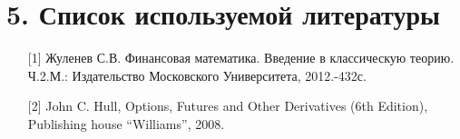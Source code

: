 \documentclass[12pt,a4 paper]{book}
\begin{document}
\newpage
\section*{5. Список используемой литературы}
\smallskip
\begin{enumerate}
\item[{[1]}] Жуленев С.В. Финансовая математика. Введение в классическую теорию. Ч.2.М.: Издательство Московского Университета, 2012.-432с.
\item[{[2]}] John C. Hull, Options, Futures and Other Derivatives (6th Edition), Publishing house “Williams”, 2008.
\end{enumerate}
\end{document}
